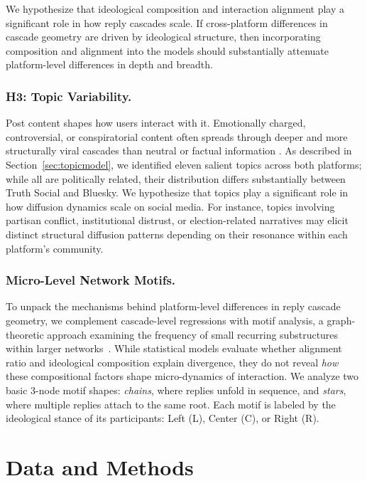 \documentclass[letterpaper]{article} %
\begin{document}
We hypothesize that ideological composition and interaction alignment play a significant role in how reply cascades scale. If cross-platform differences in cascade geometry are driven by ideological structure, then incorporating composition and alignment into the models should substantially attenuate platform-level differences in depth and breadth.

\subsubsection{H3: Topic Variability.}
Post content shapes how users interact with it. Emotionally charged, controversial, or conspiratorial content often spreads through deeper and more structurally viral cascades than neutral or factual information \cite{vosoughi_spread_2018, wang_factors_2022}. As described in Section~\ref{sec:topicmodel}, we identified eleven salient topics across both platforms; while all are politically related, their distribution differs substantially between Truth Social and Bluesky. We hypothesize that topics play a significant role in how diffusion dynamics scale on social media. For instance, topics involving partisan conflict, institutional distrust, or election-related narratives may elicit distinct structural diffusion patterns depending on their resonance within each platform's community. 

\subsubsection{Micro-Level Network Motifs.}
To unpack the mechanisms behind platform-level differences in reply cascade geometry, we complement cascade-level regressions with motif analysis, a graph-theoretic approach examining the frequency of small recurring substructures within larger networks~\cite{alon_network_2007}. While statistical models evaluate whether alignment ratio and ideological composition explain divergence, they do not reveal \textit{how} these compositional factors shape micro-dynamics of interaction. We analyze two basic 3-node motif shapes: \textit{chains}, where replies unfold in sequence, and \textit{stars}, where multiple replies attach to the same root. Each motif is labeled by the ideological stance of its participants: Left (L), Center (C), or Right (R).


\section{Data and Methods}
\end{document}
